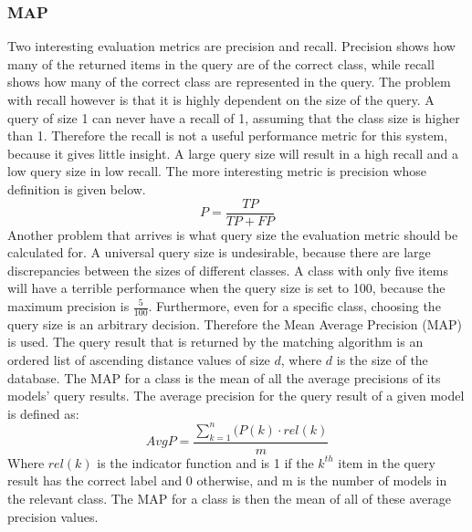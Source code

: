 \documentclass{bigdata}
\begin{document}
\subsubsection{MAP}
Two interesting evaluation metrics are precision and recall. Precision shows how many of the returned items in the query are of the correct class, while recall shows how many of the correct class are represented in the query. The problem with recall however is that it is highly dependent on the size of the query. A query of size 1 can never have a recall of 1, assuming that the class size is higher than 1. Therefore the recall is not a useful performance metric for this system, because it gives little insight. A large query size will result in a high recall and a low query size in low recall. The more interesting metric is precision whose definition is given below.
\begin{equation}
P = \frac{TP}{TP+FP}
\end{equation}
Another problem that arrives is what query size the evaluation metric should be calculated for. A universal query size is undesirable, because there are large discrepancies between the sizes of different classes. A class with only five items will have a terrible performance when the query size is set to 100, because the maximum precision is $\frac{5}{100}$. 
Furthermore, even for a specific class, choosing the query size is an arbitrary decision. Therefore the Mean Average Precision (MAP) is used.
The query result that is returned by the matching algorithm is an ordered list of ascending distance values of size $d$, where $d$ is the size of the database. The MAP for a class is the mean of all the average precisions of its models' query results. The average precision for the query result of a given model is defined as:
\begin{equation}
AvgP = \frac{\sum_{k=1}^{n}(P(k) \cdot rel(k)}{m}
\end{equation}
Where $rel(k)$ is the indicator function and is 1 if the $k^{th}$ item in the query result has the correct label and 0 otherwise, and m is the number of models in the relevant class. The MAP for a class is then the mean of all of these average precision values.\\
\end{document}
